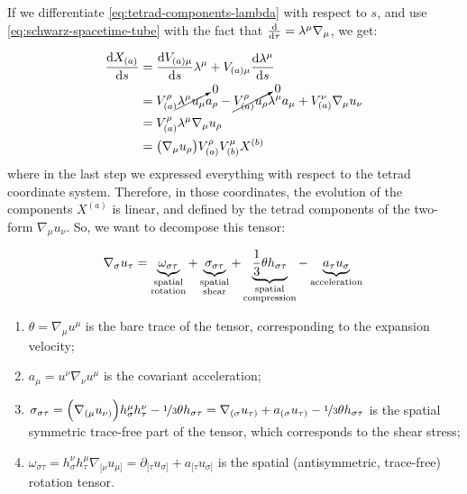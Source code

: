 \documentclass[main.tex]{subfiles}
\begin{document}
If we differentiate \eqref{eq:tetrad-components-lambda} with respect to \(s\), and use \eqref{eq:schwarz-spacetime-tube} with the fact that \(\dv{}{\tau} = \lambda^\mu \nabla_\mu \), we get:

\begin{subequations}
\begin{align}
    \dv{X_{(a)}}{s} &= \dv{V_{(a)\mu}}{s} \lambda^\mu + V_{(a)\mu} \dv{\lambda^\mu}{s}  \\
    &= V_{(a)}^\rho \cancelto{0}{\lambda^\mu u_\mu} a_\rho - \cancelto{0}{V_{(a)}^\rho  u_\rho} \lambda^\mu a_\mu
    + V_{(a)}^\nu \nabla_\mu u_\nu  \\
    &= V^\rho _{(a)} \lambda^\mu \nabla_\mu u_\rho  \\
    &= \qty(\nabla_\mu u_\rho) V^\rho_{(a)} V^{\mu}_{(b)} X^{(b)}
\end{align}
\end{subequations}
where in the last step we expressed everything with respect to the tetrad coordinate system. Therefore, in those coordinates, the evolution of the components \(X^{(a)}\) is linear, and defined by the tetrad components of the two-form \(\nabla_\mu u_\nu\). So, we want to decompose this tensor:

\begin{equation} \label{eq:covariant-acceleration-decomposition}
    \nabla_\sigma u_\tau =
    \underbrace{\omega_{\sigma \tau}}_{\substack{\text{spatial} \\ \text{rotation}}}
    + \underbrace{\sigma_{\sigma\tau}}_{\substack{\text{spatial} \\ \text{shear}}}
    + \underbrace{\frac{1}{3} \theta h_{\sigma\tau}}_{\substack{\text{spatial} \\
    \text{compression}}}
    - \underbrace{ a_\tau u_\sigma}_{ \text{acceleration}} \\
\end{equation}

\begin{enumerate}
    \item \(\theta = \nabla_\mu u^\mu\) is the bare trace of the tensor, corresponding to the expansion velocity;
    \item \(a_\mu = u^\nu \nabla_\nu u^\mu\) is the covariant acceleration;
    \item \(\sigma_{\sigma \tau} = \qty(\nabla_{(\mu} u_{\nu)}) h^\mu_\sigma h^\nu _\tau - \frac[i]{1}{3} \theta h_{\sigma \tau} = \nabla_{(\sigma} u_{\tau)} + a_{(\sigma} u_{\tau)} - \frac[i]{1}{3} \theta h_{\sigma \tau} \) is the spatial symmetric trace-free part of the tensor, which corresponds to the shear stress;
    \item \(\omega_{\sigma \tau} = h^\nu_\sigma h^\mu_\tau \nabla_{[\nu} u_{\mu]} = \partial_{[\tau} u_{\sigma]} + a_{[\tau} u_{\sigma]}\) is the spatial (antisymmetric, trace-free) rotation tensor.
\end{enumerate}
\end{document}
